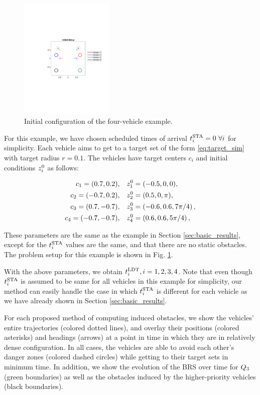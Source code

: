 \begin{figure}[H]
  \centering
  \includegraphics[width=0.40\textwidth]{"fig/init_setup"}
  \caption{Initial configuration of the four-vehicle example.}
  \label{fig:init_setup_dstb}
\end{figure}

For this example, we have chosen scheduled times of arrival $t^\text{STA}_i = 0~\forall i$ for simplicity. Each vehicle aims to get to a target set of the form \eqref{eq:target_sim} with target radius $r=0.1$. The vehicles have target centers $c_i$ and initial conditions $z_i^0$ as follows:

\begin{equation}
\begin{aligned}
c_1 = (0.7, 0.2), \quad& z_1^0 = (-0.5, 0, 0),\\
c_2 = (-0.7, 0.2), \quad& z_2^0 = (0.5, 0, \pi), \\
c_3 = (0.7, -0.7), \quad& z_3^0 = \left(-0.6, 0.6, 7\pi/4\right),\\
c_4 = (-0.7, -0.7), \quad & z_4^0 = \left(0.6, 0.6, 5\pi/4\right),
\end{aligned}
\end{equation}

These parameters are the same as the example in Section \ref{sec:basic_results}, except for the $t^\text{STA}_i$ values are the same, and that there are no static obstacles. The problem setup for this example is shown in Fig. \ref{fig:init_setup_dstb}.

With the above parameters, we obtain $t^\text{LDT}_i, i=1,2,3,4$. Note that even though $t^\text{STA}_i$ is assumed to be same for all vehicles in this example for simplicity, our method can easily handle the case in which $t^\text{STA}_i$ is different for each vehicle as we have already shown in Section \ref{sec:basic_results}.

For each proposed method of computing induced obstacles, we show the vehicles' entire trajectories (colored dotted lines), and overlay their positions (colored asterisks) and headings (arrows) at a point in time in which they are in relatively dense configuration. In all cases, the vehicles are able to avoid each other's danger zones (colored dashed circles) while getting to their target sets in minimum time. In addition, we show the evolution of the BRS over time for $Q_3$ (green boundaries) as well as the obstacles induced by the higher-priority vehicles (black boundaries).

